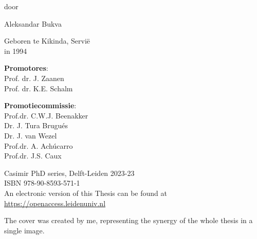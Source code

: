 \begin{titlepage}
\begin{center}
	\vspace{3\baselineskip} %
	
    {\large door}  %
    
    \vspace{3\baselineskip} %
    
	{\Large Aleksandar Bukva}
    
    
    {\large Geboren te Kikinda, Servi{\"e}\\in 1994}
    
	\vfill %
\end{center}

\clearpage
\thispagestyle{empty}

\medskip
\noindent \textbf{Promotores}:\\
Prof. dr. J. Zaanen\\
Prof. dr. K.E. Schalm 

\bigskip
\noindent \textbf{Promotiecommissie}: \\
Prof.dr. C.W.J. Beenakker\\
Dr. J. Tura Brugués\\
Dr. J. van Wezel\\
Prof.dr. A. Ach\'ucarro\\
Prof.dr. J.S. Caux\\


\vspace{2\bigskipamount}

\vspace*{\fill}
\noindent
Casimir PhD series, Delft-Leiden 2023-23\\
ISBN 978-90-8593-571-1\\

\vspace{5pt}
\noindent
An electronic version of this Thesis can be found at \\ 
\href{https://openaccess.leidenuniv.nl}{https://openaccess.leidenuniv.nl}


\vspace*{\fill}
\noindent
The cover was created by me, representing the synergy of the whole thesis in a single image.

\clearpage
\thispagestyle{empty}


\end{titlepage}
